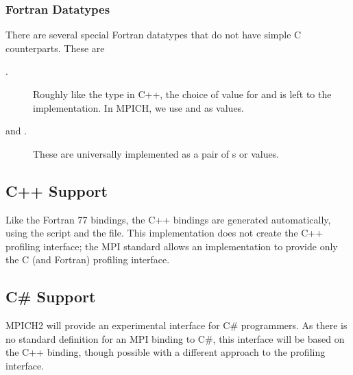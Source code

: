 \documentclass{article}
\begin{document}
\subsubsection{Fortran Datatypes}
There are several special Fortran datatypes that do not have simple C
counterparts.  These are
\begin{description}
\item[.]Roughly like the  type in C++, the choice of
  value for  and  is left to the implementation.
  In MPICH, we use  and  as values.
\item[ and .]These are universally implemented
  as a pair of s or  values.
\end{description}

\subsection{C++ Support}
\label{sec:c++}

Like the Fortran 77 bindings, the C++ bindings are generated
automatically, using the script  and the
 file.  This implementation does not create the C++
profiling interface; the MPI standard allows an implementation to
provide only the C (and Fortran) profiling interface.  

\subsection{C\# Support}
\label{sec:csharp}

MPICH2 will provide an experimental interface for C\# programmers.  As
there is no standard definition for an MPI binding to C\#, this
interface will be based on the C++ binding, though possible with a
different approach to the profiling interface.



\end{document}
